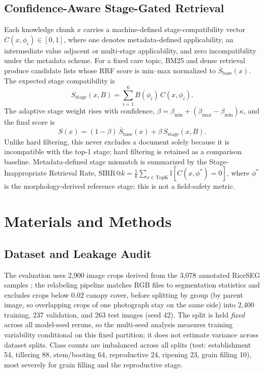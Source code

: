 \documentclass[conference,a4paper]{IEEEtran}
\begin{document}
\subsection{Confidence-Aware Stage-Gated Retrieval}

Each knowledge chunk $x$ carries a machine-defined stage-compatibility vector $C(x,\phi_i)\in[0,1]$, where one denotes metadata-defined applicability, an intermediate value adjacent or multi-stage applicability, and zero incompatibility under the metadata scheme. For a fixed care topic, BM25 and dense retrieval produce candidate lists whose RRF score is min--max normalized to $\overline{S}_{\mathrm{base}}(x)$. The expected stage compatibility is
\begin{equation}
S_{\mathrm{stage}}(x,B)=\sum_{i=1}^{6}B(\phi_i)\,C(x,\phi_i).
\end{equation}
The adaptive stage weight rises with confidence, $\beta=\beta_{\min}+(\beta_{\max}-\beta_{\min})\kappa$, and the final score is
\begin{equation}
S(x)=(1-\beta)\,\overline{S}_{\mathrm{base}}(x)+\beta\,S_{\mathrm{stage}}(x,B).
\end{equation}
Unlike hard filtering, this never excludes a document solely because it is incompatible with the top-1 stage; hard filtering is retained as a comparison baseline. Metadata-defined stage mismatch is summarized by the Stage-Inappropriate Retrieval Rate, $\mathrm{SIRR}@k=\frac{1}{k}\sum_{x\in\mathrm{TopK}}\mathbb{I}[C(x,\phi^*)=0]$, where $\phi^*$ is the morphology-derived reference stage; this is not a field-safety metric.

\section{Materials and Methods}

\subsection{Dataset and Leakage Audit}

The evaluation uses 2{,}900 image crops derived from the 3{,}078 annotated RiceSEG samples \cite{zhou2025riceseg}; the relabeling pipeline matches RGB files to segmentation statistics and excludes crops below 0.02 canopy cover, before splitting by group (by parent image, so overlapping crops of one photograph stay on the same side) into 2{,}400 training, 237 validation, and 263 test images (seed 42). The split is held \emph{fixed} across all model-seed reruns, so the multi-seed analysis measures training variability conditional on this fixed partition; it does not estimate variance across dataset splits. Class counts are imbalanced across all splits (test: establishment 54, tillering 88, stem/booting 64, reproductive 24, ripening 23, grain filling 10), most severely for grain filling and the reproductive stage.
\end{document}
